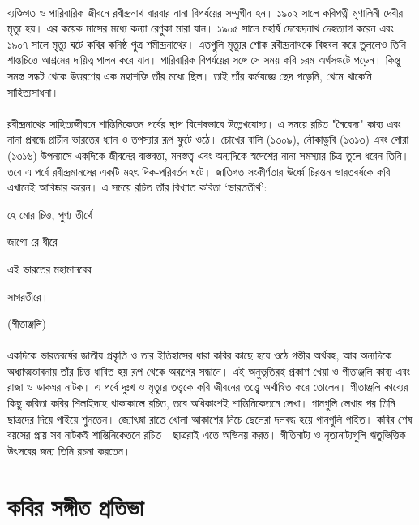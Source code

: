 \documentclass{article}
\begin{document}
\paragraph{}
ব্যক্তিগত ও পারিবারিক জীবনে রবীন্দ্রনাথ বারবার নানা বিপর্যয়ের সম্মুখীন হন। ১৯০২ সালে কবিপত্নী মৃণালিনী দেবীর মৃত্যু হয়। এর কয়েক মাসের মধ্যে কন্যা রেণুকা মারা যান। ১৯০৫ সালে মহর্ষি দেবেন্দ্রনাথ দেহত্যাগ করেন এবং ১৯০৭ সালে মৃত্যু ঘটে কবির কনিষ্ঠ পুত্র শমীন্দ্রনাথের। এতগুলি মৃত্যুর শোক রবীন্দ্রনাথকে বিহবল করে তুললেও তিনি শান্তচিত্তে আশ্রমের দায়িত্ব পালন করে যান। পারিবারিক বিপর্যয়ের সঙ্গে সে সময় কবি চরম অর্থসঙ্কটে পড়েন। কিন্তু সমস্ত সঙ্কট থেকে উত্তরণের এক মহাশক্তি তাঁর মধ্যে ছিল। তাই তাঁর কর্মযজ্ঞে ছেদ পড়েনি, থেমে থাকেনি সাহিত্যসাধনা।
\paragraph{}
রবীন্দ্রনাথের সাহিত্যজীবনে শান্তিনিকেতন পর্বের ছাপ বিশেষভাবে উল্লেখযোগ্য। এ সময়ে রচিত "নৈবেদ্য" কাব্য এবং নানা প্রবন্ধে প্রাচীন ভারতের ধ্যান ও তপস্যার রূপ ফুটে ওঠে। চোখের বালি (১৩০৯), নৌকাডুবি (১৩১৩) এবং গোরা (১৩১৬) উপন্যাসে একদিকে জীবনের বাস্তবতা, মনস্তত্ত্ব এবং অন্যদিকে স্বদেশের নানা সমস্যার চিত্র তুলে ধরেন তিনি। তবে এ পর্বে রবীন্দ্রমানসের একটি মহৎ দিক-পরিবর্তন ঘটে। জাতিগত সংকীর্ণতার ঊর্ধ্বে চিরন্তন ভারতবর্ষকে কবি এখানেই আবিষ্কার করেন। এ সময়ে রচিত তাঁর বিখ্যাত কবিতা ‘ভারততীর্থ’:

হে মোর চিত্ত, পুণ্য তীর্থে

জাগো রে ধীরে-

এই ভারতের মহামানবের

সাগরতীরে।

(গীতাঞ্জলি)
\paragraph{}
একদিকে ভারতবর্ষের জাতীয় প্রকৃতি ও তার ইতিহাসের ধারা কবির কাছে হয়ে ওঠে গভীর অর্থবহ, আর অন্যদিকে অধ্যাত্মভাবনায় তাঁর চিত্ত ধাবিত হয় রূপ থেকে অরূপের সন্ধানে। এই অনুভূতিরই প্রকাশ খেয়া ও গীতাঞ্জলি কাব্য এবং রাজা ও ডাকঘর নাটক। এ পর্বে দুঃখ ও মৃত্যুর তত্ত্বকে কবি জীবনের তত্ত্বে অর্থান্বিত করে তোলেন। গীতাঞ্জলি কাব্যের কিছু কবিতা কবির শিলাইদহে থাকাকালে রচিত, তবে অধিকাংশই শান্তিনিকেতনে লেখা। গানগুলি লেখার পর তিনি ছাত্রদের দিয়ে গাইয়ে শুনতেন। জ্যোৎস্না রাতে খোলা আকাশের নিচে ছেলেরা দলবদ্ধ হয়ে গানগুলি গাইত। কবির শেষ বয়সের প্রায় সব নাটকই শান্তিনিকেতনে রচিত। ছাত্ররাই এতে অভিনয় করত। গীতিনাট্য ও নৃত্যনাট্যগুলি ঋতুভিত্তিক উৎসবের জন্য তিনি রচনা করতেন।

\section{কবির সঙ্গীত প্রতিভা}
\end{document}
